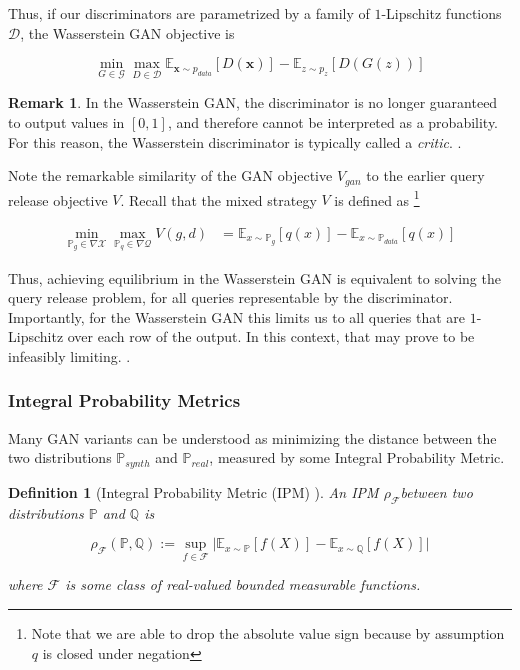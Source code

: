 \documentclass[]{article}
\newcommand{\X}{\mathcal{X}}
\newcommand{\Q}{\mathcal{Q}}
\newcommand{\F}{\mathcal{F}}
\newcommand{\E}{\mathbb{E}}
\newcommand{\p}{\mathbb{P}}
\newtheorem{definition}{Definition}[section]
\theoremstyle{definition}
\newtheorem{remark}{Remark}[section]
\begin{document}
    
    Thus, if our discriminators are parametrized by a family of $1$-Lipschitz functions $\mathcal{D}$, the Wasserstein GAN objective is
    
    \begin{equation}
        \min_{G \in \mathcal{G}} \max_{D \in \mathcal{D}} \mathbb{E}_{\mathbf{x} \sim p_{data}} [D(\mathbf{x})] - \mathbb{E}_{z \sim p_{z}} [D(G(z))]
    \end{equation}

\begin{remark}
    In the Wasserstein GAN, the discriminator is no longer guaranteed to output values in $[0,1]$, and therefore cannot be interpreted as a probability. For this reason, the Wasserstein discriminator is typically called a \emph{critic}. . 
\end{remark}

Note the remarkable similarity of the GAN objective $V_{gan}$ to the earlier query release objective $V$. Recall that the mixed strategy $V$ is defined as \footnote{Note that we are able to drop the absolute value sign because by assumption $q$ is closed under negation}

\begin{align*}
    \min_{\p_g \in \nabla \X} \max_{\p_q \in \nabla\Q }V(g,d) &= \E_{x \sim \p_g}[q(x)] - \E_{x \sim \p_{data}}[q(x)]
\end{align*}  \todo{}

Thus, achieving equilibrium in the Wasserstein GAN is equivalent to solving the query release problem, for all queries representable by the discriminator. Importantly, for the Wasserstein GAN this limits us to all queries that are $1$-Lipschitz over each row of the output. In this context, that may prove to be infeasibly limiting. .


\subsubsection{Integral Probability Metrics}

Many GAN variants can be understood as minimizing the distance between the two distributions $\p_{synth}$ and $\p_{real}$, measured by some Integral Probability Metric.

\begin{definition}[Integral Probability Metric (IPM) \cite{Mul97}]
    An IPM $\rho_\F$between two distributions $\mathbb{P}$ and $\mathbb{Q}$ is 

    \begin{equation}
        \rho_\F(\mathbb{P}, \mathbb{Q})  := \sup_{f \in \mathcal{F}} \big| \E_{x \sim \p}[f(X)] - \E_{x \sim \mathbb{Q}}[f(X)] \big|
    \end{equation}

    where $\F$ is some class of real-valued bounded measurable functions.
\end{definition}
\end{document}

